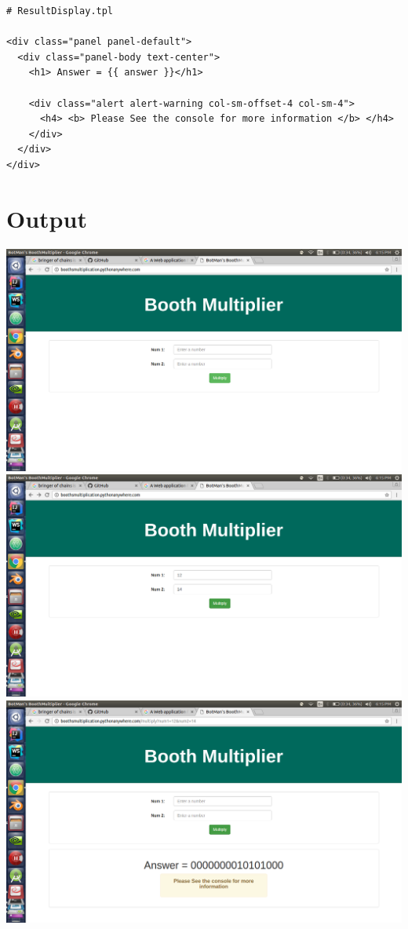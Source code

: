 \documentclass[10pt,a4paper]{article}
\newenvironment{changemargin}[2]{%
\begin{list}{}{%
\setlength{\topsep}{0pt}%
\setlength{\leftmargin}{#1}%
\setlength{\rightmargin}{#2}%
\setlength{\listparindent}{\parindent}%
\setlength{\itemindent}{\parindent}%
\setlength{\parsep}{\parskip}%
}%
\item[]}{\end{list}}
\begin{document}
\begin{changemargin}{-4cm}{-4cm}
\begin{lstlisting}
# ResultDisplay.tpl

<div class="panel panel-default">
  <div class="panel-body text-center">
    <h1> Answer = {{ answer }}</h1>

    <div class="alert alert-warning col-sm-offset-4 col-sm-4">
      <h4> <b> Please See the console for more information </b> </h4>
    </div>
  </div>
</div>

\end{lstlisting}
\end{changemargin}


\section{Output}
\includegraphics[scale=0.3]{out_1.png}
\includegraphics[scale=0.3]{out_2.png}
\includegraphics[scale=0.3]{out_3.png}
\end{document}
